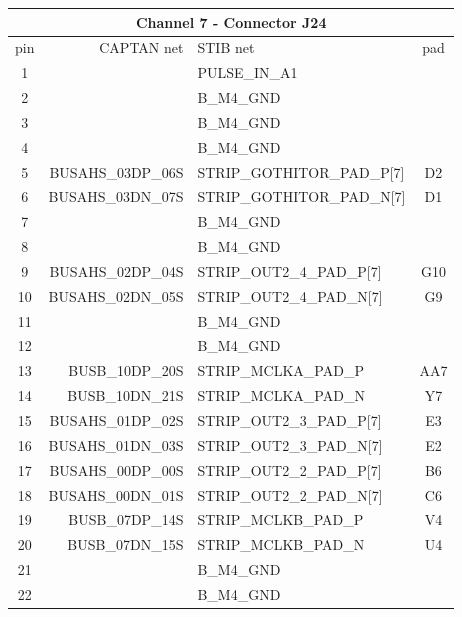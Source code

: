 \documentclass[11pt]{article}
\begin{document}
\begin{table}
\begin{center}
\scriptsize
\begin{tabular}{|c|r|l|c|} \hline
\multicolumn{4}{|c|}{Channel 7 - Connector J24} \\ \hline
pin & CAPTAN net & STIB net & pad \\ \hline\hline
 1 &                   & PULSE\_IN\_A1              &    \\
 2 &                   & B\_M4\_GND                 &    \\ \hline
 3 &                   & B\_M4\_GND                 &    \\
 4 &                   & B\_M4\_GND                 &    \\ \hline
 5 & BUSAHS\_03DP\_06S & STRIP\_GOTHITOR\_PAD\_P[7] & D2    \\
 6 & BUSAHS\_03DN\_07S & STRIP\_GOTHITOR\_PAD\_N[7] & D1    \\ \hline
 7 &                   & B\_M4\_GND                 &    \\
 8 &                   & B\_M4\_GND                 &    \\ \hline
 9 & BUSAHS\_02DP\_04S & STRIP\_OUT2\_4\_PAD\_P[7]  & G10    \\
10 & BUSAHS\_02DN\_05S & STRIP\_OUT2\_4\_PAD\_N[7]  & G9    \\ \hline
11 &                   & B\_M4\_GND                 &    \\
12 &                   & B\_M4\_GND                 &    \\ \hline
13 &   BUSB\_10DP\_20S & STRIP\_MCLKA\_PAD\_P       & AA7    \\
14 &   BUSB\_10DN\_21S & STRIP\_MCLKA\_PAD\_N       & Y7    \\ \hline
15 & BUSAHS\_01DP\_02S & STRIP\_OUT2\_3\_PAD\_P[7]  & E3    \\
16 & BUSAHS\_01DN\_03S & STRIP\_OUT2\_3\_PAD\_N[7]  & E2    \\ \hline
17 & BUSAHS\_00DP\_00S & STRIP\_OUT2\_2\_PAD\_P[7]  & B6    \\
18 & BUSAHS\_00DN\_01S & STRIP\_OUT2\_2\_PAD\_N[7]  & C6    \\ \hline
19 &   BUSB\_07DP\_14S & STRIP\_MCLKB\_PAD\_P       & V4    \\
20 &   BUSB\_07DN\_15S & STRIP\_MCLKB\_PAD\_N       & U4    \\ \hline
21 &                   & B\_M4\_GND                 &    \\
22 &                   & B\_M4\_GND                 &    \\ \hline

\end{tabular}
\end{center}
\end{table}
\end{document}
